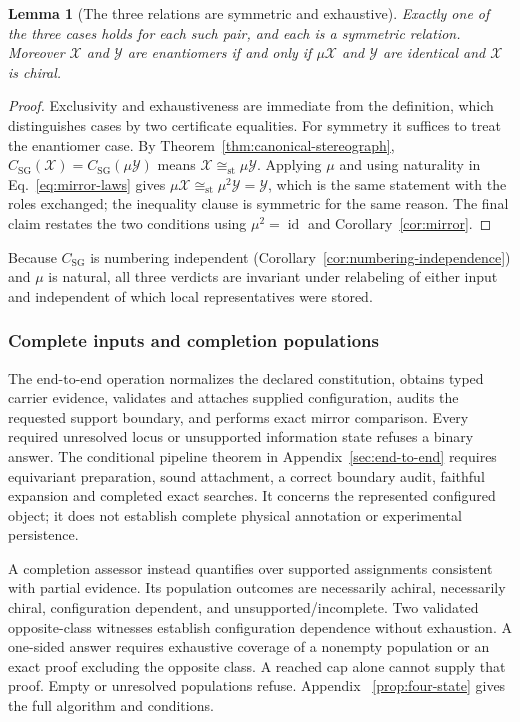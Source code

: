 \documentclass[pdflatex,sn-mathphys-num,referee,lineno]{sn-jnl}
\theoremstyle{plain}
\newtheorem{lemma}[theorem]{Lemma}
\theoremstyle{remark}
\theoremstyle{definition}
\begin{document}
\begin{lemma}[The three relations are symmetric and exhaustive]
\label{lem:stereoisomer-relations}
Exactly one of the three cases holds for each such pair, and each is a
symmetric relation.  Moreover \(\mathcal X\) and \(\mathcal Y\) are enantiomers
if and only if \(\mu\mathcal X\) and \(\mathcal Y\) are identical and
\(\mathcal X\) is chiral.
\end{lemma}

\begin{proof}
Exclusivity and exhaustiveness are immediate from the definition, which
distinguishes cases by two certificate equalities.  For symmetry it suffices to
treat the enantiomer case.  By Theorem~\ref{thm:canonical-stereograph},
\(C_{\mathrm{SG}}(\mathcal X)=C_{\mathrm{SG}}(\mu\mathcal Y)\) means
\(\mathcal X\cong_{\mathrm{st}}\mu\mathcal Y\).  Applying \(\mu\) and using
naturality in Eq.~\eqref{eq:mirror-laws} gives
\(\mu\mathcal X\cong_{\mathrm{st}}\mu^2\mathcal Y=\mathcal Y\), which is the
same statement with the roles exchanged; the inequality clause is symmetric for
the same reason.  The final claim restates the two conditions using
\(\mu^2=\operatorname{id}\) and
Corollary~\ref{cor:mirror}.
\end{proof}

Because \(C_{\mathrm{SG}}\) is numbering independent
(Corollary~\ref{cor:numbering-independence}) and \(\mu\) is natural, all three
verdicts are invariant under relabeling of either input and independent of
which local representatives were stored.

\subsubsection{Complete inputs and completion populations}
\label{sec:completion-summary}

The end-to-end operation normalizes the declared constitution, obtains typed
carrier evidence, validates and attaches supplied configuration, audits the
requested support boundary, and performs exact mirror comparison. Every
required unresolved locus or unsupported information state refuses a binary
answer. The conditional pipeline theorem in Appendix~\ref{sec:end-to-end}
requires equivariant preparation, sound attachment, a correct boundary audit,
faithful expansion and completed exact searches. It concerns the represented
configured object; it does not establish complete physical annotation or
experimental persistence.

A completion assessor instead quantifies over supported assignments consistent
with partial evidence. Its population outcomes are necessarily achiral,
necessarily chiral, configuration dependent, and unsupported/incomplete. Two
validated opposite-class witnesses establish configuration dependence without
exhaustion. A one-sided answer requires exhaustive coverage of a nonempty
population or an exact proof excluding the opposite class. A reached cap alone
cannot supply that proof. Empty or unresolved populations refuse. Appendix~
\ref{prop:four-state} gives the full algorithm and conditions.
\end{document}
